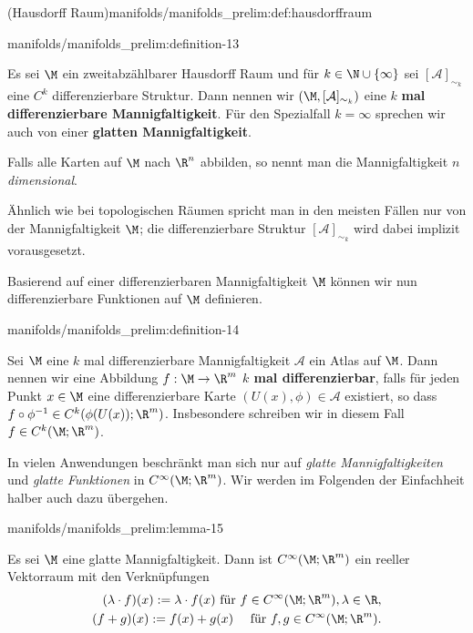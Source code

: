 \documentclass[letterpaper,10pt,english]{jupyterBook}
\begin{document}
\begin{definition}{(Hausdorff Raum)}{manifolds/manifolds_prelim:def:hausdorffraum}
\begin{definition}{}{manifolds/manifolds_prelim:definition-13}
\par
Es sei \(\M\) ein zweitabzählbarer Hausdorff Raum und für \(k\in\N\cup \{\infty\}\) sei \([\mathcal{A}]_{\sim_k}\) eine \(C^k\) differenzierbare Struktur.
Dann nennen wir \((\M,[\mathcal{A}]_{\sim_k})\) eine \(k\) \textbf{mal differenzierbare Mannigfaltigkeit}.
Für den Spezialfall \(k=\infty\) sprechen wir auch von einer \textbf{glatten Mannigfaltigkeit}.

\par
Falls alle Karten auf \(\M\) nach \(\R^n\) abbilden, so nennt man die Mannigfaltigkeit \emph{\(n\) dimensional}.
\end{definition}

\par
Ähnlich wie bei topologischen Räumen spricht man in den meisten Fällen nur von der Mannigfaltigkeit \(\M\); die differenzierbare Struktur \([\mathcal{A}]_{\sim_k}\) wird dabei implizit vorausgesetzt.

\par
Basierend auf einer differenzierbaren Mannigfaltigkeit \(\M\) können wir nun differenzierbare Funktionen auf \(\M\) definieren.
\begin{definition}{}{manifolds/manifolds_prelim:definition-14}



\par
Sei \(\M\) eine \(k\) mal differenzierbare Mannigfaltigkeit \(\mathcal{A}\) ein Atlas auf \(\M\).
Dann nennen wir eine Abbildung \(f:\M\to\R^m\) \textbf{\(k\) mal differenzierbar}, falls für jeden Punkt \(x\in\M\) eine differenzierbare Karte \((U(x),\phi)\in\mathcal{A}\) existiert, so dass \(f\circ\phi^{-1} \in C^k(\phi(U(x)); \R^m)\).
Insbesondere schreiben wir in diesem Fall \(f\in C^k(\M; \R^m)\).
\end{definition}

\par
In vielen Anwendungen beschränkt man sich nur auf \emph{glatte Mannigfaltigkeiten} und \emph{glatte Funktionen} in \(C^\infty(\M; \R^m)\).
Wir werden im Folgenden der Einfachheit halber auch dazu übergehen.
\begin{lemma}{}{manifolds/manifolds_prelim:lemma-15}



\par
Es sei \(\M\) eine glatte Mannigfaltigkeit.
Dann ist \(C^\infty(\M; \R^m)\) ein reeller Vektorraum mit den Verknüpfungen
\begin{align*}
(\lambda \cdot f)(x) := \lambda\cdot f(x)\text{ für } f\in C^\infty(\M; \R^m), \lambda\in\R,\\
(f + g)(x) := f(x) + g(x)\quad\text{ für } f,g\in C^\infty(\M; \R^m).
\end{align*}\end{lemma}


\end{definition}
\end{document}
